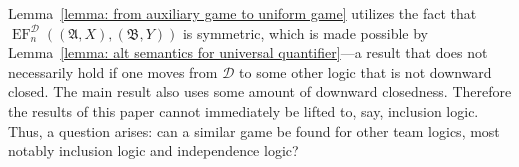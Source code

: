 \documentclass[12pt]{article}
\theoremstyle{definition}
\DeclareMathOperator{\EF}{EF}
\newcommand{\A}{\mathfrak{A}}
\newcommand{\B}{\mathfrak{B}}
\newcommand{\deplog}{\mathcal D}
\begin{document}
Lemma~\ref{lemma: from auxiliary game to uniform game} utilizes the fact that $\EF^{\deplog}_n((\A,X),(\B,Y))$ is symmetric, which is made possible by Lemma~\ref{lemma: alt semantics for universal quantifier}---a result that does not necessarily hold if one moves from $\deplog$ to some other logic that is not downward closed. The main result also uses some amount of downward closedness. Therefore the results of this paper cannot immediately be lifted to, say, inclusion logic. Thus, a question arises: can a similar game be found for other team logics, most notably inclusion logic and independence logic?




\end{document}
